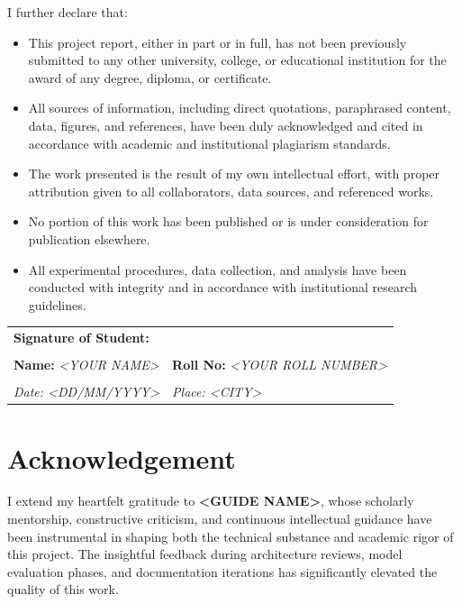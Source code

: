 \documentclass[12pt,a4paper]{report}
\newcommand{\StudentName}{<YOUR NAME>}
\newcommand{\RollNo}{<YOUR ROLL NUMBER>}
\newcommand{\GuideName}{<GUIDE NAME>}
\begin{document}
\vspace{0.3cm}
I further declare that:
\begin{itemize}
    \item This project report, either in part or in full, has not been previously submitted to any other university, college, or educational institution for the award of any degree, diploma, or certificate.
    \item All sources of information, including direct quotations, paraphrased content, data, figures, and references, have been duly acknowledged and cited in accordance with academic and institutional plagiarism standards.
    \item The work presented is the result of my own intellectual effort, with proper attribution given to all collaborators, data sources, and referenced works.
    \item No portion of this work has been published or is under consideration for publication elsewhere.
    \item All experimental procedures, data collection, and analysis have been conducted with integrity and in accordance with institutional research guidelines.
\end{itemize}

\vspace{1.5cm}
\noindent
\begin{tabular}{p{} p{}}
\textbf{Signature of Student:} & \\
\vspace{0.3cm} & \\
\textbf{Name:} \textit{\StudentName} & \textbf{Roll No:} \textit{\RollNo} \\
\vspace{0.3cm} & \\
\textit{Date: <DD/MM/YYYY>} & \textit{Place: <CITY>} \\
\end{tabular}

\chapter*{Acknowledgement}

I extend my heartfelt gratitude to \textbf{\GuideName}, whose scholarly mentorship, constructive criticism, and continuous intellectual guidance have been instrumental in shaping both the technical substance and academic rigor of this project. The insightful feedback during architecture reviews, model evaluation phases, and documentation iterations has significantly elevated the quality of this work.
\end{document}
